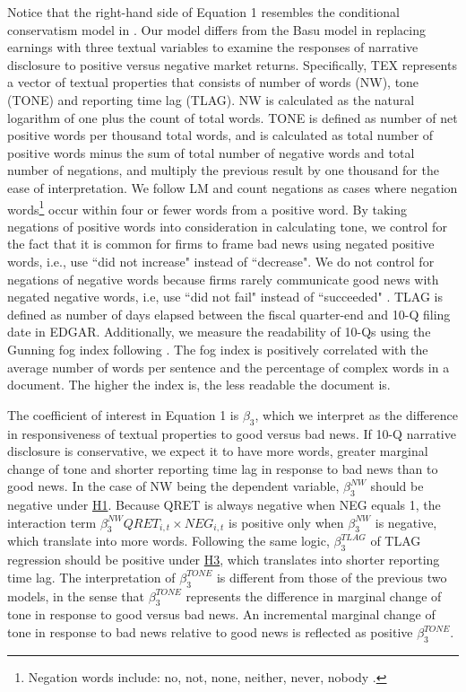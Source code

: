 \documentclass[letterpaper,11pt]{article}
\begin{document}
\begin{spacing}{1.5}
Notice that the right-hand side of Equation 1 resembles the conditional conservatism model in . Our model differs from the Basu model in replacing earnings with three textual variables to examine the responses of narrative disclosure to positive versus negative market returns. Specifically, TEX represents a vector of textual properties that consists of number of words (NW), tone (TONE) and reporting time lag (TLAG). NW is calculated as the natural logarithm of one plus the count of total words. TONE is defined as number of net positive words per thousand total words, and is calculated as total number of positive words minus the sum of total number of negative words and total number of negations, and multiply the previous result by one thousand for the ease of interpretation. We follow LM and count negations as cases where negation words\footnote{Negation words include: no, not, none, neither, never, nobody .} occur within four or fewer words from a positive word. By taking negations of positive words into consideration in calculating tone, we control for the fact that it is common for firms to frame bad news using negated positive words, i.e., use ``did not increase" instead of ``decrease". We do not control for negations of negative words because firms rarely communicate good news with negated negative words, i.e, use ``did not fail" instead of ``succeeded" \cite{loughranWhenLiabilityNot2011}. TLAG is defined as number of days elapsed between the fiscal quarter-end and 10-Q filing date in EDGAR. Additionally, we measure the readability of 10-Qs using the Gunning fog index following . The fog index is positively correlated with the average number of words per sentence and the percentage of complex words in a document. The higher the index is, the less readable the document is.

The coefficient of interest in Equation 1 is $\beta_3$, which we interpret as the difference in responsiveness of textual properties to good versus bad news. If 10-Q narrative disclosure is conservative, we expect it to have more words, greater marginal change of tone and shorter reporting time lag in response to bad news than to good news. In the case of NW being the dependent variable, $\beta_3^{NW}$ should be negative under \hyperref[h1]{H1}. Because QRET is always negative when NEG equals 1, the interaction term $\beta_3^{NW}QRET_{i,t}\times NEG_{i,t}$ is positive only when $\beta_3^{NW}$ is negative, which translate into more words. Following the same logic, $\beta_3^{TLAG}$ of TLAG regression should be positive under \hyperref[h3]{H3}, which translates into shorter reporting time lag. The interpretation of $\beta_3^{TONE}$ is different from those of the previous two models, in the sense that $\beta_3^{TONE}$ represents the difference in marginal change of tone in response to good versus bad news. An incremental marginal change of tone in response to bad news relative to good news is reflected as positive $\beta_3^{TONE}$.


\end{spacing}
\end{document}
